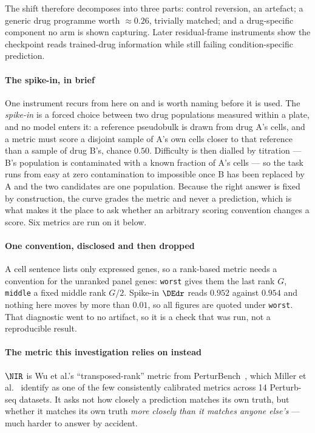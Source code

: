 The shift therefore decomposes into three parts: control reversion, an
artefact; a generic drug programme worth $\approx 0.26$, trivially matched; and
a drug-specific component no arm is shown capturing. Later residual-frame
instruments show the checkpoint reads trained-drug information while still
failing condition-specific prediction.

\paragraph{The spike-in, in brief} One instrument recurs from here on and is
worth naming before it is used. The \emph{spike-in} is a forced choice between
two drug populations measured within a plate, and no model enters it: a
reference pseudobulk is drawn from drug A's cells, and a metric must score a
disjoint sample of A's own cells closer to that reference than a sample of drug
B's, chance $0.50$. Difficulty is then dialled by titration --- B's population is
contaminated with a known fraction of A's cells --- so the task runs from easy at
zero contamination to impossible once B has been replaced by A and the two
candidates are one population. Because the right answer is fixed by
construction, the curve grades the metric and never a prediction, which is what
makes it the place to ask whether an arbitrary scoring convention changes a
score. Six metrics are run on it below.

\paragraph{One convention, disclosed and then dropped} A cell sentence lists
only expressed genes, so a rank-based metric needs a convention for the unranked
panel genes: \texttt{worst} gives them the last rank $G$, \texttt{middle} a
fixed middle rank $G/2$. Spike-in $\DEdr$ reads $0.952$ against $0.954$ and
nothing here moves by more than $0.01$, so all figures are quoted under
\texttt{worst}. That diagnostic went to no artifact, so it is a check that was
run, not a reproducible result.

\paragraph{The metric this investigation relies on instead} $\NIR$ is Wu
et al.'s ``transposed-rank'' metric from PerturBench~\cite{perturbench}, which
Miller et al.~\cite{miller} identify as one of the few consistently calibrated
metrics across 14 Perturb-seq datasets. It asks not how closely a prediction
matches its own truth, but whether it matches its own truth \emph{more closely
than it matches anyone else's} --- much harder to answer by accident.

